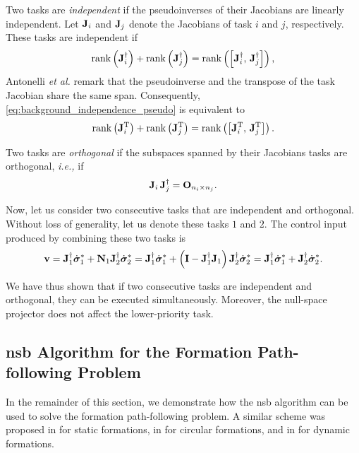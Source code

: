 Two tasks are \emph{independent} if the pseudoinverses of their Jacobians are linearly independent.
Let $\mathbf{J}_i$ and $\mathbf{J}_j$ denote the Jacobians of task $i$ and $j$, respectively.
These tasks are independent if
\begin{equation}
    {\operatorname*{rank}} \left(\mathbf{J}_i^{\dagger}\right) + {\operatorname*{rank}} \left(\mathbf{J}_j^{\dagger}\right) = {\rm rank} \left(\left[ \mathbf{J}_i^{\dagger},\, \mathbf{J}_j^{\dagger} \right]\right),
    \label{eq:background_independence_pseudo}
\end{equation}
Antonelli \emph{et al.} \cite{antonelli_stability_2008} remark that the pseudoinverse and the transpose of the task Jacobian share the same span.
Consequently, \eqref{eq:background_independence_pseudo} is equivalent to
\begin{equation}
    {\operatorname*{rank}} \left(\mathbf{J}_i^{\mathrm{T}}\right) + {\operatorname*{rank}} \left(\mathbf{J}_j^{\mathrm{T}}\right) = {\rm rank} \left(\left[ \mathbf{J}_i^{\mathrm{T}},\, \mathbf{J}_j^{\mathrm{T}} \right]\right).
    \label{eq:background_independence}
\end{equation}

Two tasks are \emph{orthogonal} if the subspaces spanned by their Jacobians tasks are orthogonal, \emph{i.e.,} if
\begin{equation}
    \mathbf{J}_i \, \mathbf{J}_j^{\dagger} = \mathbf{O}_{n_i \times n_j}.
\end{equation}

Now, let us consider two consecutive tasks that are independent and orthogonal. 
Without loss of generality, let us denote these tasks $1$ and $2$.
The control input produced by combining these two tasks is
\begin{equation}
    \mathbf{v} = \mathbf{J}_1^{\dagger} \dot{\bm{\sigma}}_1^{*} + \mathbf{N}_1 \mathbf{J}_2^{\dagger} \dot{\bm{\sigma}}_2^{*}
    = \mathbf{J}_1^{\dagger} \dot{\bm{\sigma}}_1^{*} + \left(\mathbf{I} - \mathbf{J}_1^{\dagger}\mathbf{J}_1\right) \mathbf{J}_2^{\dagger} \dot{\bm{\sigma}}_2^{*}
    = \mathbf{J}_1^{\dagger} \dot{\bm{\sigma}}_1^{*} + \mathbf{J}_2^{\dagger} \dot{\bm{\sigma}}_2^{*}.
\end{equation}

We have thus shown that if two consecutive tasks are independent and orthogonal, they can be executed simultaneously.
Moreover, the null-space projector does not affect the lower-priority task.

\subsection{\gls{nsb} Algorithm for the Formation Path-following Problem}
\label{sec:background_nsb_formation_path_following}
In the remainder of this section, we demonstrate how the \gls{nsb} algorithm can be used to solve the formation path-following problem.
A similar scheme was proposed in \cite{arrichiello_formation_2006} for static formations, in \cite{antonelli_2006_kinematic,antonelli_stability_2008} for circular formations, and in \cite{eek_formation_2021} for dynamic formations.

